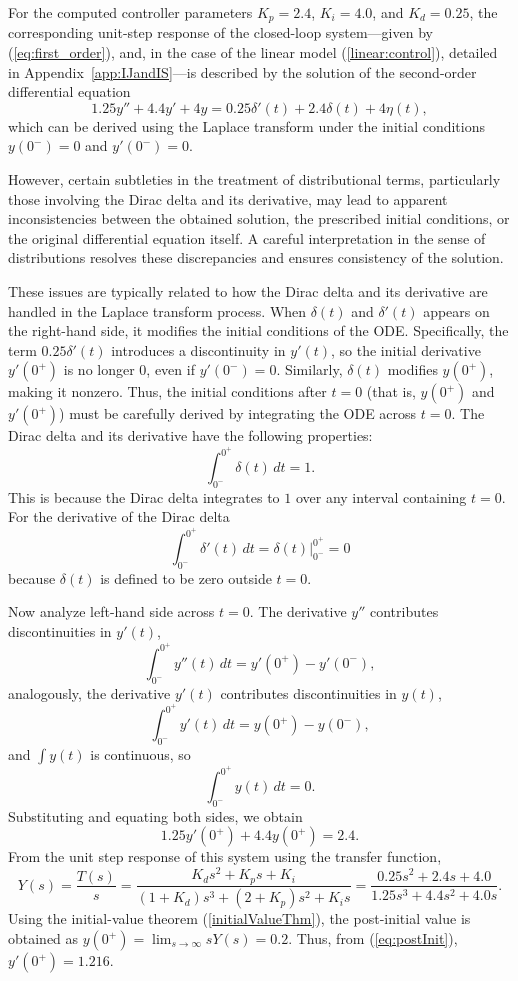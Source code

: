 \documentclass[preprint,12pt]{elsarticle}
\begin{document}
\begin{rem}\label{rem:nonzero}
For the computed controller parameters \( K_p = 2.4 \), \( K_i = 4.0 \), and \( K_d = 0.25 \), 
the corresponding unit-step response of the closed-loop system---given by (\ref{eq:first_order}), 
and, in the case of the linear model (\ref{linear:control}), detailed in Appendix~\ref{app:IJandIS}---is described by the solution of the second-order differential equation
\[
1.25y'' + 4.4y' + 4y = 0.25\delta'(t) + 2.4\delta(t) + 4\eta(t),
\]
which can be derived using the Laplace transform under the initial conditions 
\( y(0^-) = 0 \) and \( y'(0^-) = 0 \).

However, certain subtleties in the treatment of distributional terms, particularly those involving the Dirac delta and its derivative, may lead to apparent inconsistencies between the obtained solution, the prescribed initial conditions, or the original differential equation itself. A careful interpretation in the sense of distributions resolves these discrepancies and ensures consistency of the solution.


These issues are typically related to how the Dirac delta and its derivative are handled in the Laplace transform process. When \( \delta(t) \) and \( \delta'(t) \) appears on the right-hand side, it modifies the initial conditions of the ODE. Specifically, the term \( 0.25\delta'(t) \) introduces a discontinuity in \( y'(t) \), so the initial derivative \( y'(0^+) \) is no longer \( 0 \), even if \( y'(0^-) = 0 \). Similarly, \( \delta(t) \) modifies \( y(0^+) \), making it nonzero. Thus, the initial conditions after \( t = 0 \) (that is, \( y(0^+) \) and \( y'(0^+) \)) must be carefully derived by integrating the ODE across \( t = 0 \). The Dirac delta and its derivative have the following properties: 
   \[
   \int_{0^-}^{0^+} \delta(t) \, dt = 1.
   \]
This is because the Dirac delta integrates to $1$ over any interval containing \(t = 0\). For the derivative of the Dirac delta
   \[
   \int_{0^-}^{0^+} \delta'(t) \, dt = \delta(t) \Big|_{0^-}^{0^+}=0
   \]
   because \(\delta(t)\) is defined to be zero outside \(t = 0\).
   
Now analyze left-hand side across $t=0$. The derivative \(y''\) contributes discontinuities in \(y'(t)\),
\[
     \int_{0^-}^{0^+} y''(t) \, dt = y'(0^+) - y'(0^-),
\]
analogously, the derivative \(y'(t)\) contributes discontinuities in \(y(t)\),
\[
     \int_{0^-}^{0^+} y'(t) \, dt = y(0^+) - y(0^-),
\]
and \(\int y(t)\) is continuous, so
     \[
     \int_{0^-}^{0^+} y(t) \, dt = 0.
     \]
Substituting and equating both sides, we obtain
\begin{equation}\label{eq:postInit}
1.25y'(0^+) + 4.4y(0^+) = 2.4.
\end{equation}
From the unit step response of this system using the transfer function, 
\[
Y(s) =\frac{T(s)}{s} = \frac{K_d s^2 + K_p s + K_i}{(1 + K_d)s^3 + (2 + K_p)s^2 + K_i s}
= \frac{0.25s^2 + 2.4s + 4.0}{1.25s^3 + 4.4s^2 + 4.0s}.
\]
Using the initial-value theorem (\ref{initialValueThm}), the post-initial value is obtained as 
\( y(0^+) = \lim_{s \to \infty} sY(s) = 0.2 \).
Thus, from (\ref{eq:postInit}), \( y'(0^+) = 1.216 \).



\end{rem}
\end{document}
